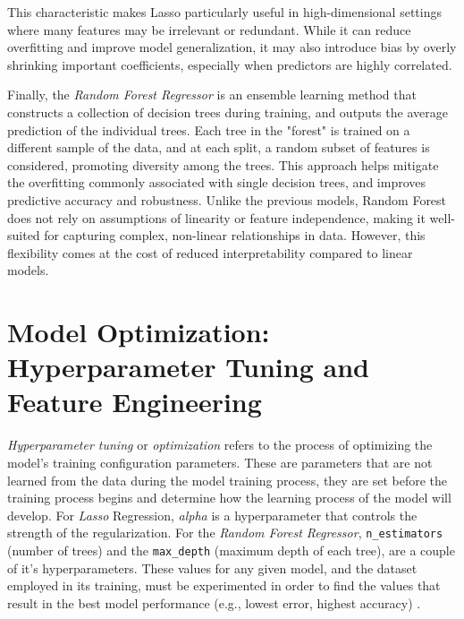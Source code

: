 \documentclass[12pt]{report} %
\begin{document}
This characteristic makes Lasso particularly useful in high-dimensional settings where many features may be irrelevant or redundant. While it can reduce overfitting and improve model generalization, it may also introduce bias by overly shrinking important coefficients, especially when predictors are highly correlated.

Finally, the \textit{Random Forest Regressor} \cite{random_forest_regressor} is an ensemble learning method that constructs a collection of decision trees during training, and outputs the average prediction of the individual trees. Each tree in the "forest" is trained on a different sample of the data, and at each split, a random subset of features is considered, promoting diversity among the trees. This approach helps mitigate the overfitting commonly associated with single decision trees, and improves predictive accuracy and robustness. Unlike the previous models, Random Forest does not rely on assumptions of linearity or feature independence, making it well-suited for capturing complex, non-linear relationships in data. However, this flexibility comes at the cost of reduced interpretability compared to linear models.


\section{Model Optimization: Hyperparameter Tuning and Feature Engineering}

\textit{Hyperparameter tuning} or \textit{optimization} refers to the process of optimizing the model's training configuration parameters. These are parameters that are not learned from the data during the model training process, they are set before the training process begins and determine how the learning process of the model will develop. For \textit{Lasso} Regression, \textit{alpha} is a hyperparameter that controls the strength of the regularization. For the \textit{Random Forest Regressor}, \verb|n_estimators| (number of trees) and the \verb|max_depth| (maximum depth of each tree), are a couple of it's hyperparameters. These values for any given model, and the dataset employed in its training, must be experimented in order to find the values that result in the best model performance (e.g., lowest error, highest accuracy) \cite{ml-bishop}.


\end{document}
